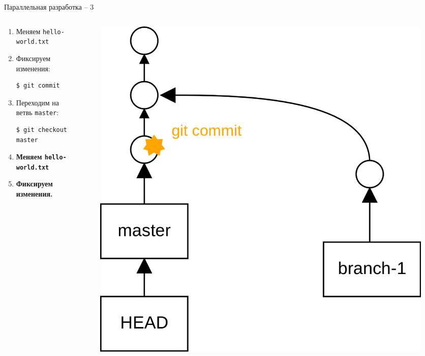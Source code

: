 \documentclass[presentation]{beamer}
\begin{document}
\begin{frame}[fragile]{Параллельная разработка -- 3}
  \begin{columns}
    \begin{column}{.5\textwidth}
      \begin{enumerate}
      \item Меняем \texttt{hello-world.txt}
      \item Фиксируем изменения:
\begin{verbatim}
$ git commit
\end{verbatim}
      \item Переходим на ветвь \texttt{master}:
\begin{verbatim}
$ git checkout master
\end{verbatim}
      \item \textbf{Меняем \texttt{hello-world.txt}}
      \item \textbf{Фиксируем изменения.}
      \end{enumerate}
      \end{column}
      \begin{column}{.5\textwidth}
        \begin{figure}[htb]
          \centering
          \includegraphics[height=.7\textheight]{git-operation-branch-4}
        \end{figure}
      \end{column}
    \end{columns}
\end{frame}
\end{document}
